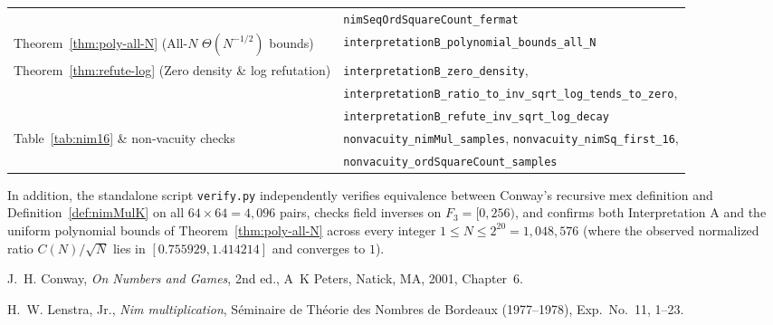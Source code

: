 \documentclass[11pt]{article}
\theoremstyle{definition}
\theoremstyle{remark}
\begin{document}
\begin{table}[!ht]
\begin{tabular}{ll}
 & \texttt{nimSeqOrdSquareCount\_fermat} \\
Theorem~\ref{thm:poly-all-N} (All-$N$ $\Theta(N^{-1/2})$ bounds) & \texttt{interpretationB\_polynomial\_bounds\_all\_N} \\
Theorem~\ref{thm:refute-log} (Zero density \& log refutation) & \texttt{interpretationB\_zero\_density}, \\
 & \texttt{interpretationB\_ratio\_to\_inv\_sqrt\_log\_tends\_to\_zero}, \\
 & \texttt{interpretationB\_refute\_inv\_sqrt\_log\_decay} \\
Table~\ref{tab:nim16} \& non-vacuity checks & \texttt{nonvacuity\_nimMul\_samples}, \texttt{nonvacuity\_nimSq\_first\_16}, \\
 & \texttt{nonvacuity\_ordSquareCount\_samples} \\
\hline
\end{tabular}
\end{table}

In addition, the standalone script \texttt{verify.py} independently verifies equivalence between Conway's recursive $\mathrm{mex}$ definition and Definition~\ref{def:nimMulK} on all $64 \times 64 = 4{,}096$ pairs, checks field inverses on $F_3 = [0, 256)$, and confirms both Interpretation A and the uniform polynomial bounds of Theorem~\ref{thm:poly-all-N} across every integer $1 \le N \le 2^{20} = 1{,}048{,}576$ (where the observed normalized ratio $C(N)/\sqrt{N}$ lies in $[0.755929, 1.414214]$ and converges to $1$).

\begin{thebibliography}{9}
J.~H. Conway, \emph{On Numbers and Games}, 2nd ed., A~K Peters, Natick, MA, 2001, Chapter~6.

H.~W. Lenstra, Jr., \emph{Nim multiplication}, S\'eminaire de Th\'eorie des Nombres de Bordeaux (1977--1978), Exp.\ No.~11, 1--23.
\end{thebibliography}
\end{document}
